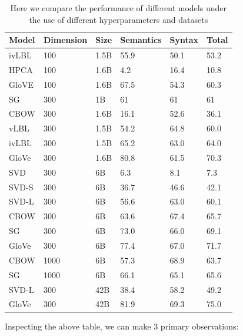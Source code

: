 \documentclass{tufte-handout}
\begin{document}
\begin{table}[ht]
  \centering
  \selectfont
  \begin{tabular}{lll | lll}
    \toprule
    Model & Dimension & Size & Semantics & Syntax & Total \\
    \midrule    
	ivLBL & 100 & 1.5B & 55.9 & 50.1 & 53.2 \\
	HPCA & 100 & 1.6B & 4.2 & 16.4 & 10.8\\
	GloVE & 100 & 1.6B & 67.5 & 54.3 & 60.3\\
	\hline
	SG & 300 & 1B & 61 & 61 & 61\\
	CBOW & 300 & 1.6B & 16.1 & 52.6 & 36.1\\
	vLBL & 300 & 1.5B & 54.2 & 64.8 & 60.0\\
	ivLBL & 300 & 1.5B & 65.2 & 63.0 & 64.0\\
	GloVe & 300 & 1.6B & 80.8 & 61.5 & 70.3\\
	\hline
	SVD & 300 & 6B & 6.3 & 8.1 & 7.3\\
	SVD-S & 300 & 6B & 36.7 & 46.6 & 42.1\\
	SVD-L & 300 & 6B & 56.6 & 63.0 & 60.1\\
	CBOW & 300 &6B & 63.6 & 67.4 & 65.7\\
	SG & 300 & 6B & 73.0 & 66.0 & 69.1\\
	GloVe & 300 & 6B & 77.4 & 67.0 & 71.7\\
	\hline
	CBOW & 1000 & 6B & 57.3 & 68.9 & 63.7\\
	SG & 1000 & 6B & 66.1 & 65.1 & 65.6\\
	SVD-L & 300 & 42B & 38.4 & 58.2 & 49.2\\
	GloVe & 300 & 42B & 81.9 & 69.3 & 75.0\\
    \bottomrule
  \end{tabular}
  \caption{Here we compare the performance of different models under the use of different hyperparameters and datasets}
  \label{tab:normaltab}
\end{table}

\FloatBarrier

Inspecting the above table, we can make 3 primary observations:
\end{document}
